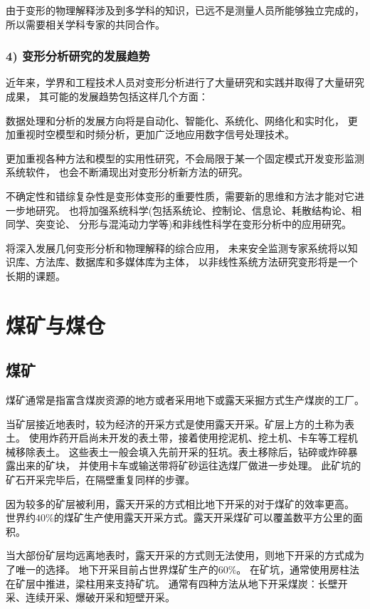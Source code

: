 由于变形的物理解释涉及到多学科的知识，已远不是测量人员所能够独立完成的，
所以需要相关学科专家的共同合作。

\subsubsection*{4) 变形分析研究的发展趋势}
近年来，学界和工程技术人员对变形分析进行了大量研究和实践并取得了大量研究成果，
其可能的发展趋势包括这样几个方面：
\begin{asparaitem}[$\bullet$]
\item 数据处理和分析的发展方向将是自动化、智能化、系统化、网络化和实时化，
更加重视时空模型和时频分析，更加广泛地应用数字信号处理技术。
\item 更加重视各种方法和模型的实用性研究，不会局限于某一个固定模式开发变形监测系统软件，
也会不断涌现出对变形分析新方法的研究。
\item 不确定性和错综复杂性是变形体变形的重要性质，需要新的思维和方法才能对它进一步地研究。
也将加强系统科学(包括系统论、控制论、信息论、耗散结构论、相同学、突变论、
分形与混沌动力学等)和非线性科学在变形分析中的应用研究。
\item 将深入发展几何变形分析和物理解释的综合应用，
未来安全监测专家系统将以知识库、方法库、数据库和多媒体库为主体，
以非线性系统方法研究变形将是一个长期的课题。
\end{asparaitem}


\section{煤矿与煤仓}
\subsection{煤矿}
煤矿通常是指富含煤炭资源的地方或者采用地下或露天采掘方式生产煤炭的工厂。

当矿层接近地表时，较为经济的开采方式是使用露天开采。矿层上方的土称为表土。
使用炸药开启尚未开发的表土带，接着使用挖泥机、挖土机、卡车等工程机械移除表土。
这些表土一般会填入先前开采的狂坑。表土移除后，钻碎或炸碎暴露出来的矿块，
并使用卡车或输送带将矿砂运往选煤厂做进一步处理。
此矿坑的矿石开采完毕后，在隔壁重复同样的步骤。

因为较多的矿层被利用，露天开采的方式相比地下开采的对于煤矿的效率更高。
世界约$40\%$的煤矿生产使用露天开采方式。露天开采煤矿可以覆盖数平方公里的面积。

当大部份矿层均远离地表时，露天开采的方式则无法使用，则地下开采的方式成为了唯一的选择。
地下开采目前占世界煤矿生产的$60\%$。
在矿坑，通常使用房柱法在矿层中推进，梁柱用来支持矿坑。
通常有四种方法从地下开采煤炭：长壁开采、连续开采、爆破开采和短壁开采。

